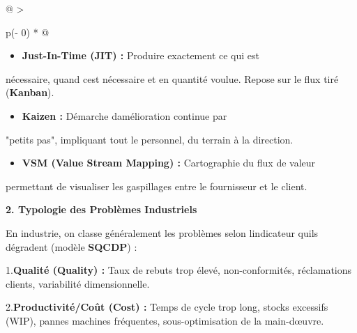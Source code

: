 \documentclass[
]{article}
\begin{document}
\begin{longtable}[]{@{}
  >{\raggedright\arraybackslash}p{(\columnwidth - 0\tabcolsep) * }@{}}
\toprule\noalign{}
\begin{minipage}[b]{\linewidth}\raggedright
\begin{center}
\end{center}

\begin{center}
\end{center}

\begin{itemize}
\item \textbf{Just-In-Time (JIT) :} Produire exactement ce qui est
\end{itemize}
nécessaire, quand c\textquotesingle est nécessaire et en quantité
voulue. Repose sur le flux tiré (\textbf{Kanban}).

\begin{itemize}
\item \textbf{Kaizen :} Démarche d\textquotesingle amélioration continue par
\end{itemize}
"petits pas", impliquant tout le personnel, du terrain à la direction.

\begin{itemize}
\item \textbf{VSM (Value Stream Mapping) :} Cartographie du flux de valeur
\end{itemize}
permettant de visualiser les gaspillages entre le fournisseur et le
client.

\textbf{2. Typologie des Problèmes Industriels}

En industrie, on classe généralement les problèmes selon
l\textquotesingle indicateur qu\textquotesingle ils dégradent (modèle
\textbf{SQCDP}) :

1.\textbf{Qualité (Quality) :} Taux de rebuts trop élevé,
non-conformités, réclamations clients, variabilité dimensionnelle.

2.\textbf{Productivité/Coût (Cost) :} Temps de cycle trop long, stocks
excessifs (WIP), pannes machines fréquentes, sous-optimisation de la
main-d\textquotesingle œuvre.


\end{minipage}
\end{longtable}
\end{document}
